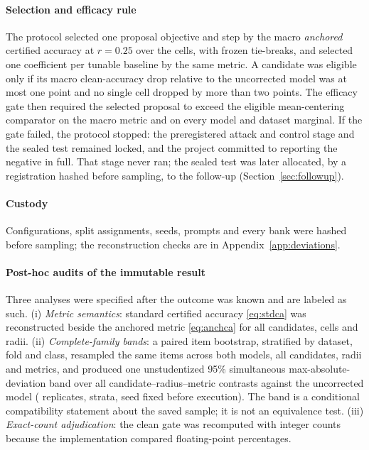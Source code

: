 \paragraph{Selection and efficacy rule}
The protocol selected one proposal objective and step by the macro
\emph{anchored} certified accuracy at $r=0.25$ over the \ExpCells{} cells, with
frozen tie-breaks, and selected one coefficient per tunable baseline by the same
metric. A candidate was eligible only if its macro clean-accuracy drop relative
to the uncorrected model was at most one point and no single cell dropped by
more than two points. The efficacy gate then required the selected proposal to
exceed the eligible mean-centering comparator on the macro metric and on every
model and dataset marginal. If the gate failed, the protocol stopped: the
preregistered attack and control stage and the sealed test remained
locked, and the project committed to reporting the negative in full. That
stage never ran; the sealed test was later allocated, by a registration hashed
before sampling, to the follow-up
(Section~\ref{sec:followup}).

\paragraph{Custody}
Configurations, split assignments, seeds, prompts and every bank were hashed
before sampling; the reconstruction checks are in
Appendix~\ref{app:deviations}.

\paragraph{Post-hoc audits of the immutable result}
Three analyses were specified after the outcome was known and are labeled as
such. (i) \emph{Metric semantics}: standard certified accuracy
\eqref{eq:stdca} was reconstructed beside the anchored metric \eqref{eq:anchca}
for all candidates, cells and radii. (ii) \emph{Complete-family bands}: a paired
item bootstrap, stratified by dataset, fold and class, resampled the same items
across both models, all candidates, radii and metrics, and produced one
unstudentized 95\% simultaneous max-absolute-deviation band over all
\BandContrasts{} candidate--radius--metric contrasts against the uncorrected
model (\BandReplicates{} replicates, \BandStrata{} strata, seed fixed before
execution). The band is a conditional compatibility statement about the saved
sample; it is not an equivalence test. (iii) \emph{Exact-count adjudication}:
the clean gate was recomputed with integer counts because the implementation
compared floating-point percentages.
